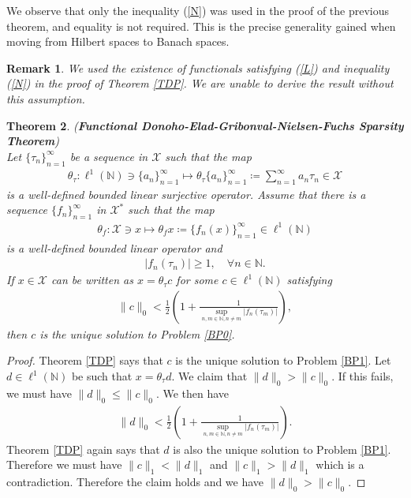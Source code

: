 \documentclass{amsart}
\newtheorem{theorem}{Theorem}[section]
\newtheorem{remark}[theorem]{Remark}
\begin{document}
We observe that only the inequality (\ref{N}) was used in the proof of the previous theorem, and equality is not required. This is the precise generality gained when moving from Hilbert spaces to Banach spaces.
\begin{remark}
	We used the existence of functionals satisfying (\ref{L}) and inequality (\ref{N}) in the proof of Theorem \ref{TDP}. We are unable to derive the result without this assumption. 
\end{remark}
\begin{theorem} \label{M}
(\textbf{Functional Donoho-Elad-Gribonval-Nielsen-Fuchs Sparsity Theorem})\\
	Let $\{\tau_n \}_{n=1}^\infty$ be a sequence in  $\mathcal{X}$ such that the map 
\begin{align*}
	\theta_\tau:\ell^1(\mathbb{N})\ni \{a_n \}_{n=1}^\infty\mapsto \theta_\tau \{a_n \}_{n=1}^\infty\coloneqq \sum_{n=1}^{\infty}a_n\tau_n \in \mathcal{X} 
\end{align*}
is a well-defined bounded linear surjective operator. Assume that there is a sequence $\{f_n \}_{n =1}^\infty$ in $\mathcal{X}^*$ such that the map 
\begin{align*}
	\theta_f: \mathcal{X} \ni x \mapsto \theta_fx\coloneqq \{f_n(x) \}_{n =1}^\infty \in \ell^1(\mathbb{N})
\end{align*}
is a well-defined bounded linear operator and 
\begin{align*}
	|f_n(\tau_n)|\geq1, \quad \forall n \in \mathbb{N}.
\end{align*}
If $x \in \mathcal{X}$ can be written as  $	x=\theta_\tau c$ for some  $c \in \ell^1(\mathbb{N})$ satisfying 
\begin{align*}
	\|c\|_0<\frac{1}{2}\left(1+\frac{1}{\displaystyle\sup_{n, m \in \mathbb{N}, n \neq m}| f_n(\tau_m)|}\right),	
\end{align*}
then $c$ is the unique solution to Problem \ref{BP0}.	
\end{theorem}
\begin{proof}
Theorem \ref{TDP} says that  $c$ is the unique solution to Problem \ref{BP1}.  Let $d \in \ell^1(\mathbb{N})$ be such that 	$x=\theta_\tau d$. We claim that $\|d\|_0> \|c\|_0$.  If this fails, we must have $\|d\|_0\leq \|c\|_0$. We then have 
\begin{align*}
	\|d\|_0<\frac{1}{2}\left(1+\frac{1}{\displaystyle\sup_{n, m \in \mathbb{N}, n \neq m}| f_n(\tau_m)|}\right).
\end{align*}
Theorem \ref{TDP} again says  that $d$ is also the unique solution to Problem \ref{BP1}. Therefore we must have  $\|c\|_1<\|d\|_1$ and $\|c\|_1>\|d\|_1$ which is a contradiction. Therefore the claim holds and we have $\|d\|_0> \|c\|_0$.
\end{proof}
\end{document}
